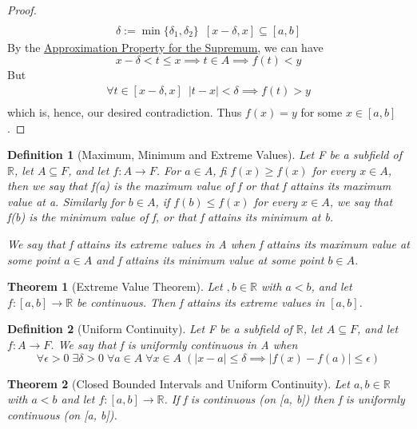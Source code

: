 \documentclass[11pt, oneside]{book}
\theoremstyle{break}
\newtheorem{thm}{Theorem}[section]
\newtheorem*{proof}{Proof}
\newtheorem{defn}{Definition}[section]
\newcommand{\bb}[1]{\mathbb{#1}}			%
\begin{document}
\begin{proof}
\begin{gather*}
		\\
		\delta := \min\{\delta_1, \delta_2\} \enspace [x - \delta, x] \subseteq [a, b]
	\end{gather*}
	By the \hyperref[approx_prop]{Approximation Property for the Supremum}, we can have
	\begin{equation*}
		x - \delta < t \leq x \implies t \in A \implies f(t) < y
	\end{equation*}
	But
	\begin{gather*}
		\forall t \in [x - \delta, x] \enspace |t - x| < \delta \implies f(t) > y \\
	\end{gather*}
	which is, hence, our desired contradiction. Thus $f(x) = y$ for some $x \in [a, b]$.
\end{proof}

\begin{defn}[Maximum, Minimum and Extreme Values]
	Let F be a subfield of $\bb{R}$, let $A \subseteq F$, and let $f: A \to F$. For $a \in A$, fi $f(x) \geq f(x)$ for every $x \in A$, then we say that f(a) is the maximum value of f or that f attains its maximum value at a. Similarly for $b \in A$, if $f(b) \leq f(x)$ for every $x \in A$, we say that f(b) is the minimum value of f, or that f attains its minimum at b.

	We say that f attains its extreme values in A when f attains its maximum value at some point $a \in A$ and f attains its minimum value at some point $b \in A$.
\end{defn}

\begin{thm}[Extreme Value Theorem]\label{EVT}
	Let $, b \in \bb{R}$ with $a < b$, and let $f: [a, b] \to \bb{R}$ be continuous. Then f attains its extreme values in $[a, b]$.
\end{thm}

\begin{defn}[Uniform Continuity]
	Let F be a subfield of $\bb{R}$, let $A \subseteq F$, and let $f: A \to F$. We say that f is uniformly continuous in A when
	\[
		\forall \epsilon > 0 \; \exists \delta > 0 \; \forall a \in A \; \forall x \in A \; (|x - a| \leq \delta \implies |f(x) - f(a)| \leq \epsilon)
	\]
\end{defn}

\begin{thm}[Closed Bounded Intervals and Uniform Continuity]\label{closed_bounded_cts_fn_unif}
	Let $a, b \in \bb{R}$ with $a < b$ and let $f: [a, b] \to \bb{R}$. If f is continuous (on [a, b]) then f is uniformly continuous (on [a, b]).
\end{thm}
\end{document}
